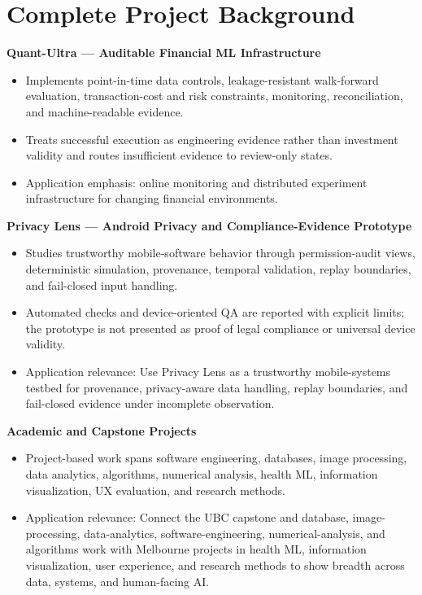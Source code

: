 \documentclass[11pt]{article}
\begin{document}
\section*{Complete Project Background}
\textbf{Quant-Ultra --- Auditable Financial ML Infrastructure}
\begin{itemize}
\item Implements point-in-time data controls, leakage-resistant walk-forward evaluation, transaction-cost and risk constraints, monitoring, reconciliation, and machine-readable evidence.
\item Treats successful execution as engineering evidence rather than investment validity and routes insufficient evidence to review-only states.
\item Application emphasis: online monitoring and distributed experiment infrastructure for changing financial environments.
\end{itemize}

\textbf{Privacy Lens --- Android Privacy and Compliance-Evidence Prototype}
\begin{itemize}
\item Studies trustworthy mobile-software behavior through permission-audit views, deterministic simulation, provenance, temporal validation, replay boundaries, and fail-closed input handling.
\item Automated checks and device-oriented QA are reported with explicit limits; the prototype is not presented as proof of legal compliance or universal device validity.
\item Application relevance: Use Privacy Lens as a trustworthy mobile-systems testbed for provenance, privacy-aware data handling, replay boundaries, and fail-closed evidence under incomplete observation.
\end{itemize}

\textbf{Academic and Capstone Projects}
\begin{itemize}
\item Project-based work spans software engineering, databases, image processing, data analytics, algorithms, numerical analysis, health ML, information visualization, UX evaluation, and research methods.
\item Application relevance: Connect the UBC capstone and database, image-processing, data-analytics, software-engineering, numerical-analysis, and algorithms work with Melbourne projects in health ML, information visualization, user experience, and research methods to show breadth across data, systems, and human-facing AI.
\end{itemize}
\end{document}
